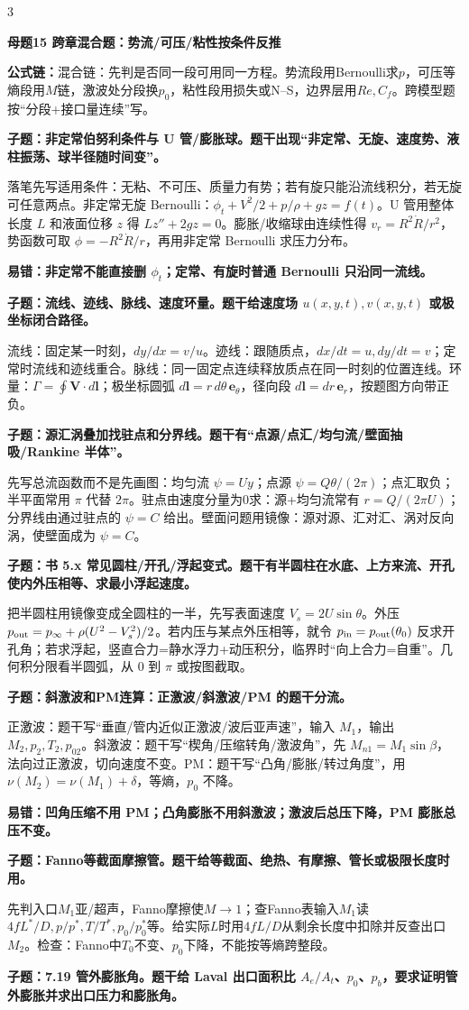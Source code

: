 \documentclass[a4paper]{article}
\newcommand{\mt}[1]{\vspace{0.22pt}\colorbox{M}{\parbox{\dimexpr\linewidth-2\fboxsep}{\color{white}\bfseries #1}}\par}
\newcommand{\qt}[1]{\vspace{0.10pt}\colorbox{Q}{\parbox{\dimexpr\linewidth-2\fboxsep}{\color{white}\bfseries #1}}\par}
\newcommand{\ans}[1]{\colorbox{G}{\parbox{\dimexpr\linewidth-2\fboxsep}{#1}}\par}
\newcommand{\warn}[1]{\colorbox{Y}{\parbox{\dimexpr\linewidth-2\fboxsep}{\color{E}\bfseries #1}}\par}
\newcommand{\form}[1]{{\color{M}\bfseries 公式链：}#1\par}
\begin{document}
\begin{multicols}{3}
\mt{母题15 跨章混合题：势流/可压/粘性按条件反推}
\form{混合链：先判是否同一段可用同一方程。势流段用Bernoulli求$p$，可压等熵段用$M$链，激波处分段换$p_0$，粘性段用损失或N--S，边界层用$Re,C_f$。跨模型题按“分段+接口量连续”写。}
\qt{子题：非定常伯努利条件与 U 管/膨胀球。题干出现“非定常、无旋、速度势、液柱振荡、球半径随时间变”。}
\ans{落笔先写适用条件：无粘、不可压、质量力有势；若有旋只能沿流线积分，若无旋可任意两点。非定常无旋 Bernoulli：$\phi_t+V^2/2+p/\rho+gz=f(t)$。U 管用整体长度 $L$ 和液面位移 $z$ 得 $Lz''+2gz=0$。膨胀/收缩球由连续性得 $v_r=R^2\dot R/r^2$，势函数可取 $\phi=-R^2\dot R/r$，再用非定常 Bernoulli 求压力分布。}
\warn{易错：非定常不能直接删 $\phi_t$；定常、有旋时普通 Bernoulli 只沿同一流线。}
\qt{子题：流线、迹线、脉线、速度环量。题干给速度场 $u(x,y,t),v(x,y,t)$ 或极坐标闭合路径。}
\ans{流线：固定某一时刻，$dy/dx=v/u$。迹线：跟随质点，$dx/dt=u,dy/dt=v$；定常时流线和迹线重合。脉线：同一固定点连续释放质点在同一时刻的位置连线。环量：$\Gamma=\oint\bm V\cdot d\bm l$；极坐标圆弧 $d\bm l=r\,d\theta\,\bm e_\theta$，径向段 $d\bm l=dr\,\bm e_r$，按题图方向带正负。}
\qt{子题：源汇涡叠加找驻点和分界线。题干有“点源/点汇/均匀流/壁面抽吸/Rankine 半体”。}
\ans{先写总流函数而不是先画图：均匀流 $\psi=Uy$；点源 $\psi=Q\theta/(2\pi)$；点汇取负；半平面常用 $\pi$ 代替 $2\pi$。驻点由速度分量为0求：源+均匀流常有 $r=Q/(2\pi U)$；分界线由通过驻点的 $\psi=C$ 给出。壁面问题用镜像：源对源、汇对汇、涡对反向涡，使壁面成为 $\psi=C$。}
\qt{子题：书 5.x 常见圆柱/开孔/浮起变式。题干有半圆柱在水底、上方来流、开孔使内外压相等、求最小浮起速度。}
\ans{把半圆柱用镜像变成全圆柱的一半，先写表面速度 $V_s=2U\sin\theta$。外压 $p_{\rm out}=p_\infty+\rho(U^2-V_s^2)/2$。若内压与某点外压相等，就令 $p_{\rm in}=p_{\rm out}(\theta_0)$ 反求开孔角；若求浮起，竖直合力=静水浮力+动压积分，临界时“向上合力=自重”。几何积分限看半圆弧，从 $0$ 到 $\pi$ 或按图截取。}
\qt{子题：斜激波和PM连算：正激波/斜激波/PM 的题干分流。}
\ans{正激波：题干写“垂直/管内近似正激波/波后亚声速”，输入 $M_1$，输出 $M_2,p_2,T_2,p_{02}$。斜激波：题干写“楔角/压缩转角/激波角”，先 $M_{n1}=M_1\sin\beta$，法向过正激波，切向速度不变。PM：题干写“凸角/膨胀/转过角度”，用 $\nu(M_2)=\nu(M_1)+\delta$，等熵，$p_0$ 不降。}
\warn{易错：凹角压缩不用 PM；凸角膨胀不用斜激波；激波后总压下降，PM 膨胀总压不变。}
\qt{子题：Fanno等截面摩擦管。题干给等截面、绝热、有摩擦、管长或极限长度时用。}
\ans{先判入口$M_1$亚/超声，Fanno摩擦使$M\to1$；查Fanno表输入$M_1$读$4fL^*/D,p/p^*,T/T^*,p_0/p_0^*$等。给实际$L$时用$4fL/D$从剩余长度中扣除并反查出口$M_2$。检查：Fanno中$T_0$不变、$p_0$下降，不能按等熵跨整段。}
\qt{子题：7.19 管外膨胀角。题干给 Laval 出口面积比 $A_e/A_t$、$p_0$、$p_b$，要求证明管外膨胀并求出口压力和膨胀角。}

\end{multicols}
\end{document}
